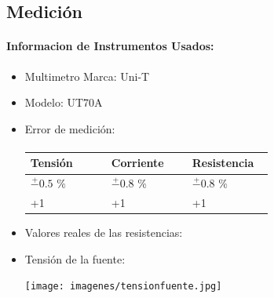 \documentclass[a4paper,12pt]{article}
\begin{document}
\vspace{1.5cm}

\subsection{Medición}

\paragraph{Informacion de Instrumentos Usados:} 

\begin{itemize}
    \item Multimetro Marca: Uni-T
    \item Modelo: UT70A
    \item Error de medición:


\paragraph{}

\vspace{0.5cm}

\renewcommand{\arraystretch}{1.5}

\begin{table}[h]
    \centering
    \begin{tabular}{|>{\centering\arraybackslash}p{0.3\linewidth}|>{\centering\arraybackslash}p{0.3\linewidth}|>{\centering\arraybackslash}p{0.3\linewidth}|} \hline 
         Tensión&  Corriente& Resistencia\\ \hline 
         $\stackrel{+}{-} 0.5$ \%  &  $\stackrel{+}{-} 0.8$ \% & $\stackrel{+}{-} 0.8$ \% \\ \hline 
         +1&  +1& +1\\ \hline
    \end{tabular}

\vspace{0.5cm}
    
\end{table}

\item Valores reales de las resistencias:

\item Tensión de la fuente:

\texttt{[image: imagenes/tensionfuente.jpg]}\\[1cm]

\end{itemize}

\vspace{0.5cm}
\end{document}
